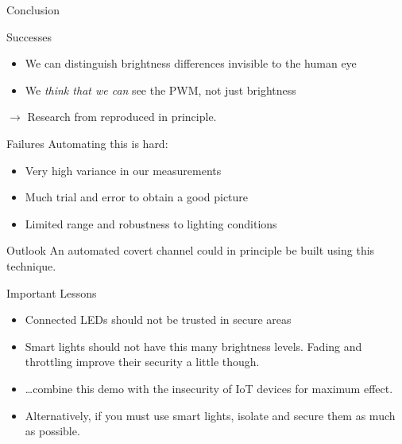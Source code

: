 \documentclass[11pt,t,usepdftitle=false,aspectratio=169]{beamer}
\begin{document}
\begin{frame}{Conclusion} %
	\begin{block}{Successes}
		\begin{itemize}
			\item We can distinguish brightness differences invisible to the human eye
			\item We \emph{think that we can} see the PWM, not just brightness
		\end{itemize}
		$\rightarrow$ Research from \cite{Ronen:2016:EFAIDCSL} reproduced in principle.
	\end{block}

	\pause
	\begin{alertblock}{Failures}
		Automating this is hard:
		\begin{itemize}
			\item Very high variance in our measurements
			\item Much trial and error to obtain a good picture
			\item Limited range and robustness to lighting conditions
		\end{itemize}
	\end{alertblock}
\end{frame}

\begin{frame}{Outlook} %
	An automated covert channel could in principle be built using this technique.

	\begin{block}{Important Lessons}
		\begin{itemize}
			\item Connected LEDs should not be trusted in secure areas
			\item Smart lights should not have this many brightness levels. Fading and throttling improve their security a little though.
			\item \ldots combine this demo with the insecurity of IoT devices for maximum effect.
			\item Alternatively, if you must use smart lights, isolate and secure them as much as possible.
		\end{itemize}
	\end{block}

\end{frame}
\end{document}
